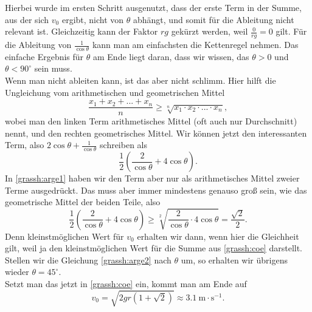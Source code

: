 \begin{Answer}
\begin{equation}
	\end{equation}
	Hierbei wurde im ersten Schritt ausgenutzt, dass der erste Term in der Summe, aus der sich $v_0$ ergibt, nicht von $\theta$ abhängt, und somit für die Ableitung nicht relevant ist. Gleichzeitig kann der Faktor $rg$ gekürzt werden, weil $\frac{0}{rg} = 0$ gilt. Für die Ableitung von $\frac{1}{\cos \theta}$ kann man am einfachsten die Kettenregel nehmen. Das einfache Ergebnis für $\theta$ am Ende liegt daran, dass wir wissen, das $\theta>0$ und $\theta<90^\circ$ sein muss.\\
	Wenn man nicht ableiten kann, ist das aber nicht schlimm. Hier hilft die Ungleichung vom arithmetischen und geometrischen Mittel
	\begin{equation}\label{grassh:arge}
	\frac{x_1+x_2+...+x_n}{n}\geq \sqrt[n]{x_1\cdot x_2 \cdot ... \cdot x_n},
	\end{equation} 
	wobei man den linken Term arithmetisches Mittel (oft auch nur Durchschnitt) nennt, und den rechten geometrisches Mittel.
	Wir können jetzt den interessanten Term, also $2 \cos \theta + \frac{1}{\cos \theta}$ schreiben als 
	\begin{equation}\label{grassh:arge1}
		\frac{1}{2}\left(\frac{2}{\cos \theta} + 4 \cos \theta\right).
	\end{equation}
	In \eqref{grassh:arge1} haben wir den Term aber nur als arithmetisches Mittel zweier Terme ausgedrückt. Das muss aber immer mindestens genauso groß sein, wie das geometrische Mittel der beiden Teile, also
	\begin{equation}\label{grassh:arge2}
		\frac{1}{2}\left(\frac{2}{\cos \theta} + 4 \cos \theta\right) \geq \sqrt[2]{\frac{2}{\cos \theta}\cdot 4 \cos \theta} = \frac{\sqrt{2}}{2}.
	\end{equation}
	Denn kleinstmöglichen Wert für $v_0$ erhalten wir dann, wenn hier die Gleichheit gilt, weil ja den kleinstmöglichen Wert für die Summe aus \eqref{grassh:coe} darstellt. Stellen wir die Gleichung \eqref{grassh:arge2} nach $\theta$ um, so erhalten wir übrigens wieder $\theta = 45^\circ$.\\
	Setzt man das jetzt in \eqref{grassh:coe} ein, kommt man am Ende auf
	\begin{equation*}
		\boxed{
		v_0 = \sqrt{2gr\left(1+\sqrt{2}\right)}\approx 3.1~\mathrm{m\cdot s^{-1}}.}
	\end{equation*}
\end{Answer}
